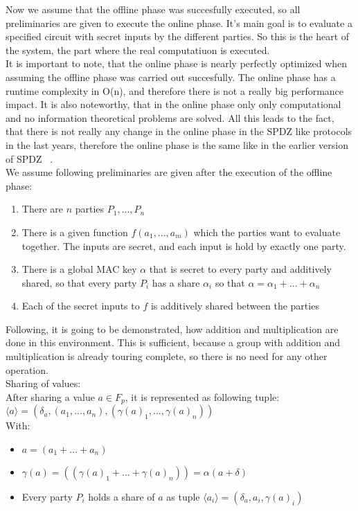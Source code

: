 \documentclass[english,runningheads,a4paper]{llncs}[2018/03/10]
\begin{document}
Now we assume that the offline phase was succesfully executed, so all preliminaries are given to execute the online phase. It's main goal is to evaluate a specified circuit with secret inputs by the different parties. So this is the heart of the system, the part where the real computatiuon is executed. \\
It is important to note, that the online phase is nearly perfectly optimized when assuming the offline phase was carried out succesfully. The online phase has a runtime complexity in O(n), and therefore there is not a really big performance impact. It is also noteworthy, that in the online phase only only computational and no information theoretical problems are solved. All this leads to the fact, that there is not really any change in the online phase in the SPDZ like protocols in the last years, therefore the online phase is the same like in the earlier version of SPDZ ~\cite{cryptoeprint:2011:535}.\\


We assume following preliminaries are given after the execution of the offline phase:\\
\begin{enumerate}
\item There are \(n\) parties \(P_1,...,P_n\)
\item There is a given function \(f(a_1,...,a_m)\) which the parties want to evaluate together. The inputs are secret, and each input is hold by exactly one party.
\item There is a global MAC key \( \alpha\) that is secret to every party and additively shared, so that every party \( P_i\) has a share  \( \alpha_i\) so that  \( \alpha=\alpha_1+...+\alpha_n\)
\item Each of the secret inputs to \(f\) is additively shared between the parties

\end{enumerate}

Following, it is going to be demonstrated, how addition and multiplication are done in this environment. This is sufficient, because a group with addition and multiplication is already touring complete, so there is no need for any other operation.\\

Sharing of values:\\
After sharing a value \( a \in F_p\), it is represented as following tuple:\\
$\langle a\rangle=(\delta_a, (a_1,...,a_n),(\gamma (a)_1,...,\gamma (a)_n))$
\\With:
\begin{itemize}
\item $ a=(a_1+...+a_n)$
\item $ \gamma (a)=((\gamma (a)_1+...+\gamma (a)_n))=\alpha(a+\delta)$
\item Every party \( P_i\) holds a share of \( a\) as tuple \(\langle a_i\rangle = (\delta_a,a_i,\gamma(a)_i )\)

\end{itemize}
\end{document}
